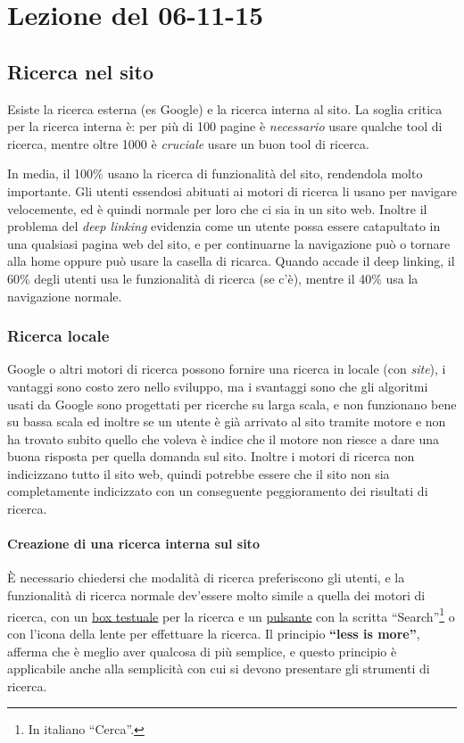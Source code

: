 \section{Lezione del 06-11-15}

\subsection{Ricerca nel sito}

Esiste la ricerca esterna (es Google) e la ricerca interna al sito. La soglia critica per la ricerca interna \`e: per pi\`u di 100 pagine \`e \textit{necessario} usare qualche tool di ricerca, mentre oltre 1000 \`e \textit{cruciale} usare un buon tool di ricerca.

In media, il 100\% usano la ricerca di funzionalit\`a del sito, rendendola molto importante. Gli utenti essendosi abituati ai motori di ricerca li usano per navigare velocemente, ed \`e quindi normale per loro che ci sia in un sito web. Inoltre il problema del \textit{deep linking} evidenzia come un utente possa essere catapultato in una qualsiasi pagina web del sito, e per continuarne la navigazione pu\`o o tornare alla home oppure pu\`o usare la casella di ricarca. Quando accade il deep linking, il 60\% degli utenti usa le funzionalit\`a di ricerca (se c'\`e), mentre il 40\% usa la navigazione normale.

\subsubsection{Ricerca locale}

Google o altri motori di ricerca possono fornire una ricerca in locale (con \textit{site}), i vantaggi sono costo zero nello sviluppo, ma i svantaggi sono che gli algoritmi usati da Google sono progettati per ricerche su larga scala, e non funzionano bene su bassa scala ed inoltre se un utente \`e gi\`a arrivato al sito tramite motore e non ha trovato subito quello che voleva \`e indice che il motore non riesce a dare una buona risposta per quella domanda sul sito. Inoltre i motori di ricerca non indicizzano tutto il sito web, quindi potrebbe essere che il sito non sia completamente indicizzato con un conseguente peggioramento dei risultati di ricerca.

\paragraph*{Creazione di una ricerca interna sul sito}\`E necessario chiedersi che modalit\`a di ricerca preferiscono gli utenti, e la funzionalit\`a di ricerca normale dev'essere molto simile a quella dei motori di ricerca, con un \underline{box testuale} per la ricerca e un \underline{pulsante} con la scritta ``Search''\footnote{In italiano ``Cerca''.} o con l'icona della lente per effettuare la ricerca.
Il principio \textbf{``less is more''}, afferma che \`e meglio aver qualcosa di pi\`u semplice, e questo principio \`e applicabile anche alla semplicit\`a con cui si devono presentare gli strumenti di ricerca.



